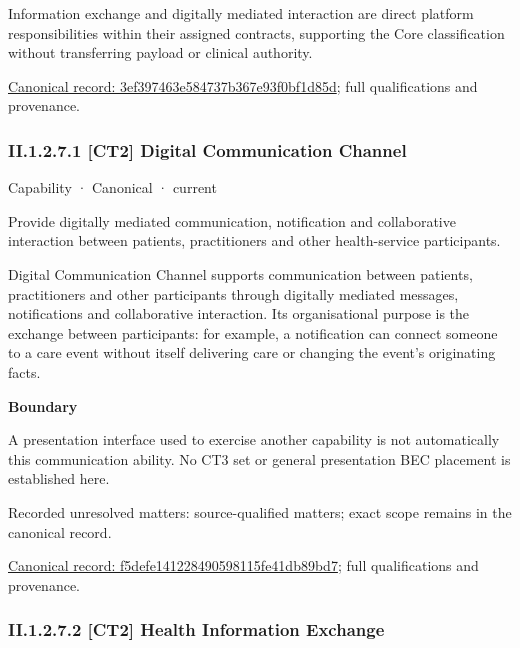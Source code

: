 Information exchange and digitally mediated interaction are direct platform responsibilities within their assigned contracts, supporting the Core classification without transferring payload or clinical authority.


{\footnotesize \href{../../../../continuum/strategy/capability/3ef397463e584737b367e93f0bf1d85d.md}{Canonical record: 3ef397463e584737b367e93f0bf1d85d}; full qualifications and provenance.}\par
\subsubsection*{II.1.2.7.1 [CT2] Digital Communication Channel}
\label{navigation:II.1.2.7.1}

\label{element:f5defe141228490598115fe41db89bd7}
{\small Capability · Canonical · current}\par

Provide digitally mediated communication, notification and collaborative interaction between patients, practitioners and other health-service participants.



Digital Communication Channel supports communication between patients, practitioners and other participants through digitally mediated messages, notifications and collaborative interaction. Its organisational purpose is the exchange between participants: for example, a notification can connect someone to a care event without itself delivering care or changing the event's originating facts.



\textbf{Boundary}



A presentation interface used to exercise another capability is not automatically this communication ability. No CT3 set or general presentation BEC placement is established here.


{\small Recorded unresolved matters: source-qualified matters; exact scope remains in the canonical record.}\par
{\footnotesize \href{../../../../continuum/strategy/capability/f5defe141228490598115fe41db89bd7.md}{Canonical record: f5defe141228490598115fe41db89bd7}; full qualifications and provenance.}\par
\subsubsection*{II.1.2.7.2 [CT2] Health Information Exchange}
\label{navigation:II.1.2.7.2}

